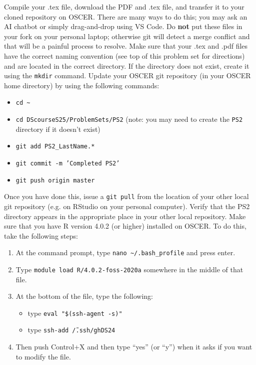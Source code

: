 \documentclass[12pt,english]{exam}
\begin{document}
\begin{questions}
\question Compile your .tex file, download the PDF and .tex file, and transfer it to your cloned repository on OSCER. There are many ways to do this;  you may ask an AI chatbot or simply drag-and-drop using VS Code. Do \textbf{not} put these files in your fork on your personal laptop; otherwise git will detect a merge conflict and that will be a painful process to resolve.
\question Make sure that your .tex and .pdf files have the correct naming convention (see top of this problem set for directions) and are located in the correct directory. If the directory does not exist, create it using the \texttt{mkdir} command.
\question Update your OSCER git repository (in your OSCER home directory) by using the following commands:
\begin{itemize}
    \item \texttt{cd \~}
    \item \texttt{cd DScourseS25/ProblemSets/PS2} (note: you may need to create the \texttt{PS2} directory if it doesn't exist)
    \item \texttt{git add PS2\_LastName.*}
    \item \texttt{git commit -m 'Completed PS2'}
    \item \texttt{git push origin master}
\end{itemize}
Once you have done this, issue a \texttt{git pull} from the location of your other local git repository (e.g. on RStudio on your personal computer). Verify that the PS2 directory appears in the appropriate place in your other local repository.
\question Make sure that you have R version 4.0.2 (or higher) installed on OSCER. To do this, take the following steps:
\begin{enumerate}
    \item At the command prompt, type \texttt{nano \textasciitilde/.bash\_profile} and press enter. 
    \item Type \texttt{module load R/4.0.2-foss-2020a} somewhere in the middle of that file. 
    \item At the bottom of the file, type the following:
        \begin{itemize}
        \item type \texttt{eval "\$(ssh-agent -s)"}
        \item type \texttt{ssh-add \~/.ssh/ghDS24}
        \end{itemize}
    \item Then push Control+X and then type ``yes'' (or ``y'') when it asks if you want to modify the file.
\end{enumerate}

\end{questions}
\end{document}
